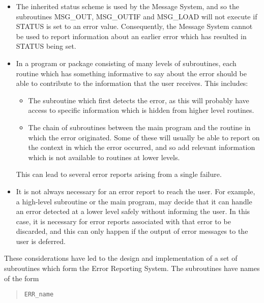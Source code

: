 \begin {itemize}
\item The inherited status scheme is used by the Message System, and so the 
subroutines MSG\_OUT, MSG\_OUTIF and MSG\_LOAD will not execute if STATUS is
set to an error value. 
Consequently, the Message System cannot be used to report information about
an earlier error which has resulted in STATUS being set. 

\item In a program or package consisting of many levels of subroutines, each
routine which has something informative to say about the error should be
able to contribute to the information that the user receives.
This includes:

\begin {itemize}
\item The subroutine which first detects the error, as this will probably
have access to specific information which is hidden from higher level
routines. 

\item The chain of subroutines between the main program and the routine in
which the error originated.
Some of these will usually be able to report on the context in which the error
occurred, and so add relevant information which is not available to routines 
at lower levels. 
\end {itemize}

This can lead to several error reports arising from a single failure. 

\item It is not always necessary for an error report to reach the user. 
For example, a high-level subroutine or the main program, may decide that it
can handle an error detected at a lower level safely without informing the
user. 
In this case, it is necessary for error reports associated with that
error to be discarded, and this can only happen if the output of error
messages to the user is deferred. 

\end {itemize}

These considerations have led to the design and implementation of a set of
subroutines which form the Error Reporting System.
The subroutines have names of the form

\begin {quote}
\begin {small}
\begin{verbatim}
ERR_name
\end{verbatim}
\end {small}
\end {quote}

